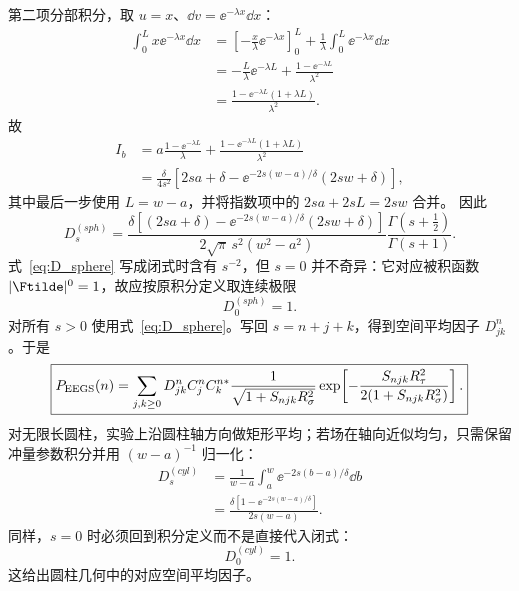 第二项分部积分，取 $u=x$、$\dd v=\ee^{-\lambda x}\dd x$：
\begin{align}
\int_0^Lx\ee^{-\lambda x}\dd x
&=\left[-\frac{x}{\lambda}\ee^{-\lambda x}\right]_0^L
+\frac{1}{\lambda}\int_0^L\ee^{-\lambda x}\dd x\\
&=-\frac{L}{\lambda}\ee^{-\lambda L}
+\frac{1-\ee^{-\lambda L}}{\lambda^2}\\
&=\frac{1-\ee^{-\lambda L}(1+\lambda L)}{\lambda^2}.
\end{align}
故
\begin{align}
I_b
&=a\frac{1-\ee^{-\lambda L}}{\lambda}
+\frac{1-\ee^{-\lambda L}(1+\lambda L)}{\lambda^2}\\
&=\frac{\delta}{4s^2}
\left[
2sa+\delta-
\ee^{-2s(w-a)/\delta}(2sw+\delta)
\right],
\label{eq:radialIntegral}
\end{align}
其中最后一步使用 $L=w-a$，并将指数项中的
$2sa+2sL=2sw$ 合并。
因此
\begin{equation}
\boxed{
D_s^{(sph)}=
\frac{\delta\left[(2sa+\delta)-
\ee^{-2s(w-a)/\delta}(2sw+\delta)\right]}
{2\sqrt\pi\,s^2(w^2-a^2)}
\frac{\Gamma(s+\frac12)}{\Gamma(s+1)}.}
\label{eq:D_sphere}
\end{equation}
式~\eqref{eq:D_sphere} 写成闭式时含有 $s^{-2}$，但 $s=0$ 并不奇异：它对应被积函数 $|\Ftilde|^{0}=1$，故应按原积分定义取连续极限
\begin{equation}
\boxed{D_0^{(sph)}=1.}
\label{eq:D-sphere-s0}
\end{equation}
对所有 $s>0$ 使用式~\eqref{eq:D_sphere}。写回 \(s=n+j+k\)，得到空间平均因子
\(D_{jk}^n\)。于是
\begin{equation}
\boxed{
P_{\rm EEGS}(n)=
\sum_{j,k\ge0}
D_{jk}^n C_j^nC_k^{n*}
\frac{1}{\sqrt{1+S_{njk}R_\sigma^2}}
\exp\!\left[-\frac{S_{njk}R_\tau^2}
{2(1+S_{njk}R_\sigma^2)}\right].}
\label{eq:coherent-spatially-averaged-series}
\end{equation}
对无限长圆柱，实验上沿圆柱轴方向做矩形平均；若场在轴向近似均匀，只需保留冲量参数积分并用 \((w-a)^{-1}\) 归一化：
\begin{align}
D_s^{(cyl)}
&=\frac{1}{w-a}\int_a^w
\ee^{-2s(b-a)/\delta}\dd b\\
&=\boxed{
\frac{\delta\left[1-\ee^{-2s(w-a)/\delta}\right]}
{2s(w-a)}}.
\label{eq:D_cyl}
\end{align}
同样，$s=0$ 时必须回到积分定义而不是直接代入闭式：
\begin{equation}
\boxed{D_0^{(cyl)}=1.}
\end{equation}
这给出圆柱几何中的对应空间平均因子。


